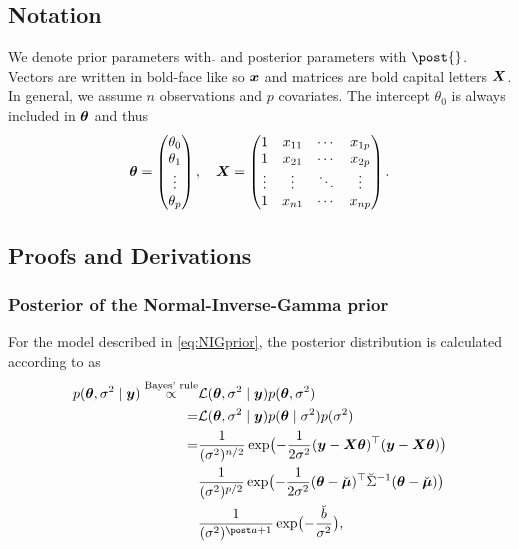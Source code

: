 \subsection*{Notation}

We denote prior parameters with $\breve{}$ and posterior parameters with $\post{}$. Vectors are written in bold-face like so $\bm{x}$ and matrices are bold capital letters $\bm{X}$. In general, we assume $n$ observations and $p$ covariates. The intercept $\theta_0$ is always included in $\bm{\theta}$ and thus \begin{equation*}
    \bm{\theta} = \begin{pmatrix} \theta_0 \\ \theta_1 \\ \vdots \\ \theta_{p} \end{pmatrix}, \quad
    \bm{X} = \begin{pmatrix}
        1 & x_{11} & \cdots & x_{1p} \\
        1 & x_{21} & \cdots & x_{2p} \\
        \vdots & \vdots & \ddots & \vdots \\
        1 & x_{n1} & \cdots & x_{np} \\
    \end{pmatrix}.
\end{equation*}


\subsection*{Proofs and Derivations}

\subsubsection*{Posterior of the Normal-Inverse-Gamma prior}
For the model described in \eqref{eq:NIGprior}, the posterior distribution is calculated according to \citet{fahrmeir_regression_2021} as
\begin{equation*}
    \begin{aligned}
        p(\btheta, \ssd \mid \by) \overset{\text{Bayes' rule}}{\propto}& \Lcal(\btheta, \ssd \mid \by) p(\btheta, \ssd) \\
        =& \Lcal(\btheta, \ssd \mid \by) p(\btheta \mid \ssd) p(\ssd) \\
        =& \frac{1}{(\ssd)^{n/2}} \exp\bigl( - \frac{1}{2\ssd} (\by - \bX \btheta)^\top(\by - \bX \btheta) \bigr)\\
        &\frac{1}{(\ssd)^{p/2}} \exp\bigl( - \frac{1}{2\ssd} (\btheta - \mupri)^\top \Sdipri (\btheta - \mupri) \bigr)\\
        & \frac{1}{(\ssd)^{\apo + 1}} \exp\bigl( - \frac{\bpri}{\ssd} \bigr),
    \end{aligned}
\end{equation*}

